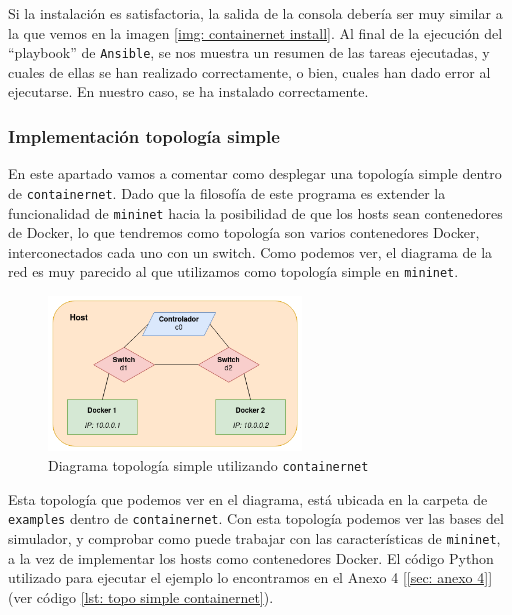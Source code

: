 \documentclass[12pt]{article}
\begin{document}
	\noindent Si la instalación es satisfactoria, la salida de la consola debería ser muy similar a la que vemos en la imagen \ref{img: containernet install}. Al final de la ejecución del ``playbook'' de \texttt{Ansible}, se nos muestra un resumen de las tareas ejecutadas, y cuales de ellas se han realizado correctamente, o bien, cuales han dado error al ejecutarse. En nuestro caso, se ha instalado correctamente.
	
	\subsubsection{Implementación topología simple}
	\noindent En este apartado vamos a comentar como desplegar una topología simple dentro de \texttt{containernet}. Dado que la filosofía de este programa es extender la funcionalidad de \texttt{mininet} hacia la posibilidad de que los hosts sean contenedores de Docker, lo que tendremos como topología son varios contenedores Docker, interconectados cada uno con un switch. Como podemos ver, el diagrama de la red es muy parecido al que utilizamos como topología simple en \texttt{mininet}.
	
	\begin{figure}[h!]
		\begin{center}
			\includegraphics[width=0.6\textwidth]{img/cn_simple_diag.png}
			\caption{Diagrama topología simple utilizando \texttt{containernet}}
		\end{center}
	\end{figure}

	\pagebreak
	
	\noindent Esta topología que podemos ver en el diagrama, está ubicada en la carpeta de \texttt{examples} dentro de \texttt{containernet}. Con esta topología podemos ver las bases del simulador, y comprobar como puede trabajar con las características de \texttt{mininet}, a la vez de implementar los hosts como contenedores Docker. El código Python utilizado para ejecutar el ejemplo lo encontramos en el Anexo 4 [\ref{sec: anexo 4}] (ver código \ref{lst: topo simple containernet}). \\
	
\end{document}
